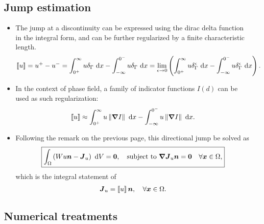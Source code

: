 \subsection{Jump estimation}

\begin{frame}
    \begin{itemize}
        \item The jump at a discontinuity can be expressed using the dirac delta function in the integral form, and can be further regularized by a finite characteristic length.
              \begin{align*}
                  \left\llbracket u\right\rrbracket = u^+ - u^- = \int_{0^+}^\infty u \delta_\Gamma \text{ d}{x} - \int_{-\infty}^{0^-} u \delta_\Gamma \text{ d}{x} = \lim_{\epsilon\to 0} \left( \int_{0^+}^\infty u \delta_\Gamma^\epsilon \text{ d}{x} - \int_{-\infty}^{0^-} u \delta_\Gamma^\epsilon \text{ d}{x} \right).
              \end{align*}
        \item In the context of phase field, a family of indicator functions $I(d)$ can be used as such regularization:
              \begin{align*}
                  \left\llbracket u\right\rrbracket \approx \int_{0^+}^\infty u \left\lVert\boldsymbol{\nabla} I\right\rVert \text{ d}{x} - \int_{-\infty}^{0^-} u \left\lVert\boldsymbol{\nabla} I\right\rVert \text{ d}{x}.
              \end{align*}
        \item Following the remark on the previous page, this directional jump be solved as
              \begin{equation*}
                  \boxed{\int_\Omega \left( W u \boldsymbol{n} - \boldsymbol{J}_u \right) \text{ d}{V} = \boldsymbol{0}, \quad \text{subject to } \boldsymbol{\nabla} \boldsymbol{J}_u \boldsymbol{n} = \boldsymbol{0} \quad \forall \boldsymbol{x} \in \Omega,}
              \end{equation*}
              which is the integral statement of
              \begin{align*}
                  \boldsymbol{J}_u = \left\llbracket u\right\rrbracket\boldsymbol{n}, \quad \forall \boldsymbol{x} \in \Omega.
              \end{align*}
    \end{itemize}
\end{frame}

\subsection{Numerical treatments}

